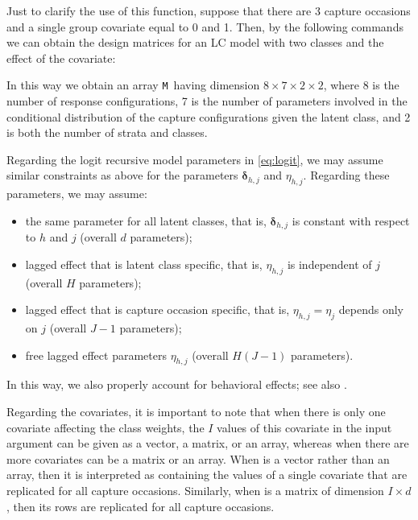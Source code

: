Just to clarify the use of this function, suppose that there are 3 capture occasions and a single group covariate equal to 0 and 1.
Then, by the following commands we can obtain the design matrices for an LC model with two classes and the effect of the covariate:


\noindent In this way we obtain an array {\tt M} having dimension $8$, where 8 is the number of response configurations, 7 is the number of parameters involved in the conditional distribution of the capture configurations given the latent class, and 2 is both the number of strata and classes.

Regarding the logit recursive model parameters in \eqref{eq:logit}, we may assume similar constraints as above for the parameters $\bm{\delta}_{h,j}$ and $\eta_{h,j}$. Regarding these parameters, we may assume:
%
\begin{itemize}
%
\item the same parameter for all latent classes, that is, $\bm{\delta}_{h,j}$ is constant with respect to $h$ and $j$ (overall $d$ parameters);
%
\item lagged effect that is latent class specific, that is, $\eta_{h,j}$ is independent of $j$ (overall $H$ parameters);
%
\item lagged effect that is capture occasion specific, that is, $\eta_{h,j}=\eta_{j}$ depends only on $j$ (overall $J-1$ parameters);
%
\item free lagged effect parameters $\eta_{h,j}$ (overall $H(J-1)$ parameters).
%
\end{itemize}
%
In this way, we also properly account for behavioral effects; see also \cite{FegaTa2016}.

Regarding the covariates, it is important to note that when there is only one covariate affecting the class weights, the $I$ values of this covariate in the input argument  can be given as a vector, a matrix, or an array, whereas when there are more covariates  can be a matrix or an array.
When  is a vector rather than an array, then it is interpreted as containing the values of a single covariate that are replicated for all capture occasions.
Similarly, when  is a matrix of dimension $I\times d$, then its rows are replicated for all capture occasions.


